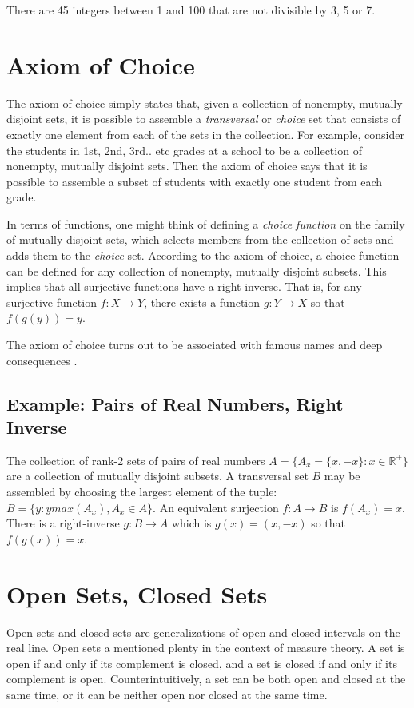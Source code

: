 There are 45 integers between 1 and 100 that are not divisible by 3, 5 or 7.


\section{Axiom of Choice}
The axiom of choice simply states that, given a collection of nonempty, mutually disjoint sets, it is possible to assemble a \textit{transversal} or \textit{choice} set that consists of exactly one element from each of the sets in the collection. For example, consider the students in 1st, 2nd, 3rd.. etc grades at a school to be a collection of nonempty, mutually disjoint sets. Then the axiom of choice says that it is possible to assemble a subset of students with exactly one student from each grade. 


In terms of functions, one might think of defining a \textit{choice function} on the family of mutually disjoint sets, which selects members from the collection of sets and adds them to the \textit{choice} set. According to the axiom of choice, a choice function can be defined for any collection of nonempty, mutually disjoint subsets. This implies that all surjective functions have a right inverse. That is, for any surjective function $f:X\rightarrow Y$, there exists a function $g:Y\rightarrow X$ so that $f(g(y)) = y$.   

The axiom of choice turns out to be associated with famous names and deep consequences \cite{stanfordaxiomofchoice}.

\subsection{Example: Pairs of Real Numbers, Right Inverse}
The collection of rank-2 sets of pairs of real numbers $A= \{ A_x = \{x,-x\} : x\in \mathbb{R}^{+}\}$ are a collection of mutually disjoint subsets. A transversal set $B$ may be assembled by choosing the largest element of the tuple: $B = \{y : y max(A_x), A_x \in A \}$. An equivalent surjection $f:A\rightarrow B$ is $f(A_x) = x$. There is a right-inverse $g:B\rightarrow A$ which is $g(x) = (x,-x)$ so that $f(g(x)) = x$.



\section{Open Sets, Closed Sets}
Open sets and closed sets are generalizations of open and closed intervals on the real line. Open sets a mentioned plenty in the context of measure theory. A set is open if and only if its complement is closed, and a set is closed if and only if its complement is open. Counterintuitively, a set can be both open and closed at the same time, or it can be neither open nor closed at the same time.

